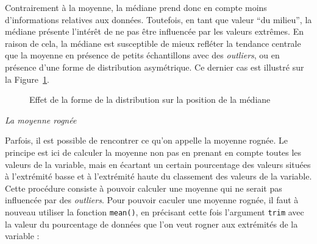 \documentclass[
  letterpaper,
]{book}
\begin{document}
Contrairement à la moyenne, la médiane prend donc en compte moins
d'informations relatives aux données. Toutefois, en tant que valeur ``du
milieu'', la médiane présente l'intérêt de ne pas être influencée par
les valeurs extrêmes. En raison de cela, la médiane est susceptible de
mieux refléter la tendance centrale que la moyenne en présence de petits
échantillons avec des \emph{outliers}, ou en présence d'une forme de
distribution asymétrique. Ce dernier cas est illustré sur la
Figure~\ref{fig-mediansSkewedVariables}.

\begin{figure}


\caption{\label{fig-mediansSkewedVariables}Effet de la forme de la
distribution sur la position de la médiane}

\end{figure}%

\emph{La moyenne rognée}

Parfois, il est possible de rencontrer ce qu'on appelle la moyenne
rognée. Le principe est ici de calculer la moyenne non pas en prenant en
compte toutes les valeurs de la variable, mais en écartant un certain
pourcentage des valeurs situées à l'extrémité basse et à l'extrémité
haute du classement des valeurs de la variable. Cette procédure consiste
à pouvoir calculer une moyenne qui ne serait pas influencée par des
\emph{outliers}. Pour pouvoir caculer une moyenne rognée, il faut à
nouveau utiliser la fonction \texttt{mean()}, en précisant cette fois
l'argument \texttt{trim} avec la valeur du pourcentage de données que
l'on veut rogner aux extrémités de la variable :
\end{document}
